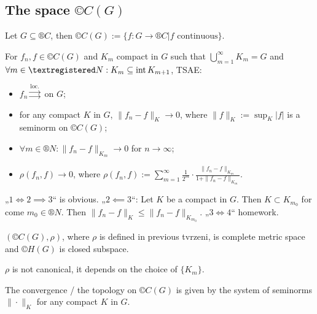 \documentclass[12pt]{article}					%
\begin{document}
\subsection{The space \texorpdfstring{$©C(G)$}{C(G)}}
\begin{definice}
	Let $G \subseteq ®C$, then $©C(G) := \{f: G \rightarrow ®C | f \text{ continuous}\}$.
\end{definice}

\begin{tvrzeni}
	For $f_n, f \in ©C(G)$ and $K_m$ compact in $G$ such that $\bigcup_{m=1}^∞ K_m = G$ and $\forall m \in ®N: K_m \subseteq \Int K_{m+1}$, TSAE:
	
	\begin{itemize}
		\item $f_n \overset{\text{loc.}}\rightrightarrows$ on $G$;
		\item for any compact $K$ in $G$, $\|f_n - f\|_K \rightarrow 0$, where $\|f\|_K := \sup_K |f|$ is a seminorm on $©C(G)$;
		\item $\forall m \in ®N: \|f_n - f\|_{K_m} \rightarrow 0$ for $n \rightarrow ∞$;
		\item $ρ(f_n, f) \rightarrow 0$, where $ρ(f_n, f) := \sum_{m=1}^∞ \frac{1}{2^m}·\frac{\|f_n - f\|_{K_m}}{1 + \|f_n - f\|_{K_m}}$.
	\end{itemize}

	\begin{dukazin}
		„$1 \Leftrightarrow 2 \implies 3$“ is obvious. „$2 \impliedby 3$“: Let $K$ be a compact in $G$. Then $K \subset K_{m_0}$ for come $m_0 \in ®N$. Then $\|f_n - f\|_K ≤ \|f_n - f\|_{K_{m_0}}$. „$3 \Leftrightarrow 4$“ homework.
	\end{dukazin}
\end{tvrzeni}

\begin{poznamka}
	$(©C(G), ρ)$, where $ρ$ is defined in previous tvrzeni, is complete metric space and $©H(G)$ is closed subspace.

	$ρ$ is not canonical, it depends on the choice of $\{K_m\}$.

	The convergence / the topology on $©C(G)$ is given by the system of seminorms $\|·\|_K$ for any compact $K$ in $G$.
\end{poznamka}
\end{document}
